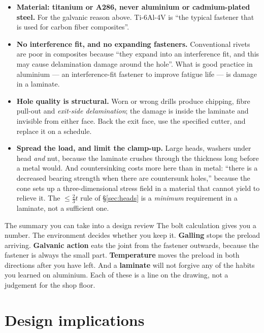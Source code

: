\documentclass[11pt,a4paper]{article}
\begin{document}
\begin{itemize}[leftmargin=*,itemsep=3pt]
\item \textbf{Material: titanium or A286, never aluminium or cadmium-plated steel.} For the galvanic
  reason above. Ti-6Al-4V is ``the typical fastener that is used for carbon fiber composites''.
\item \textbf{No interference fit, and no expanding fasteners.} Conventional rivets are poor in
  composites because ``they expand into an interference fit, and this may cause delamination damage
  around the hole''. What is good practice in aluminium --- an interference-fit fastener to improve
  fatigue life --- is damage in a laminate.
\item \textbf{Hole quality is structural.} Worn or wrong drills produce chipping, fibre pull-out and
  \emph{exit-side delamination}; the damage is inside the laminate and invisible from either face.
  Back the exit face, use the specified cutter, and replace it on a schedule.
\item \textbf{Spread the load, and limit the clamp-up.} Large heads, washers under head \emph{and}
  nut, because the laminate crushes through the thickness long before a metal would. And
  countersinking costs more here than in metal: ``there is a decreased bearing strength when there
  are countersunk holes,'' because the cone sets up a three-dimensional stress field in a material
  that cannot yield to relieve it. The $\le\tfrac{2}{3}t$ rule of \S\ref{sec:heads} is a
  \emph{minimum} requirement in a laminate, not a sufficient one.
\end{itemize}

\begin{keybox}{The summary you can take into a design review}
The bolt calculation gives you a number. The environment decides whether you keep it.
\textbf{Galling} stops the preload arriving. \textbf{Galvanic action} eats the joint from the
fastener outwards, because the fastener is always the small part. \textbf{Temperature} moves the
preload in both directions after you have left. And a \textbf{laminate} will not forgive any of the
habits you learned on aluminium. Each of these is a line on the drawing, not a judgement for the
shop floor.
\end{keybox}

\section{Design implications}
\end{document}
